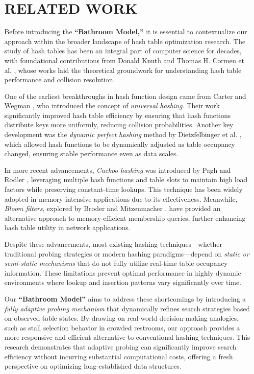 \section{RELATED WORK}
Before introducing the \textbf{``Bathroom Model,''} it is essential to contextualize our approach within the broader landscape of hash table optimization research. The study of hash tables has been an integral part of computer science for decades, with foundational contributions from Donald Knuth \cite{knuth1998} and Thomas H. Cormen et al. \cite{cormen2009}, whose works laid the theoretical groundwork for understanding hash table performance and collision resolution.

One of the earliest breakthroughs in hash function design came from Carter and Wegman \cite{carter1977}, who introduced the concept of \textit{universal hashing}. Their work significantly improved hash table efficiency by ensuring that hash functions distribute keys more uniformly, reducing collision probabilities. Another key development was the \textit{dynamic perfect hashing} method by Dietzfelbinger et al. \cite{dietzfelbinger1990}, which allowed hash functions to be dynamically adjusted as table occupancy changed, ensuring stable performance even as data scales.

In more recent advancements, \textit{Cuckoo hashing} was introduced by Pagh and Rodler \cite{pagh2004}, leveraging multiple hash functions and table slots to maintain high load factors while preserving constant-time lookups. This technique has been widely adopted in memory-intensive applications due to its effectiveness. Meanwhile, \textit{Bloom filters}, explored by Broder and Mitzenmacher \cite{broder2003}, have provided an alternative approach to memory-efficient membership queries, further enhancing hash table utility in network applications.

Despite these advancements, most existing hashing techniques—whether traditional probing strategies or modern hashing paradigms—depend on \textit{static or semi-static mechanisms} that do not fully utilize real-time table occupancy information. These limitations prevent optimal performance in highly dynamic environments where lookup and insertion patterns vary significantly over time.

Our \textbf{``Bathroom Model''} aims to address these shortcomings by introducing a \textit{fully adaptive probing mechanism} that dynamically refines search strategies based on observed table states. By drawing on real-world decision-making analogies, such as stall selection behavior in crowded restrooms, our approach provides a more responsive and efficient alternative to conventional hashing techniques. This research demonstrates that adaptive probing can significantly improve search efficiency without incurring substantial computational costs, offering a fresh perspective on optimizing long-established data structures.